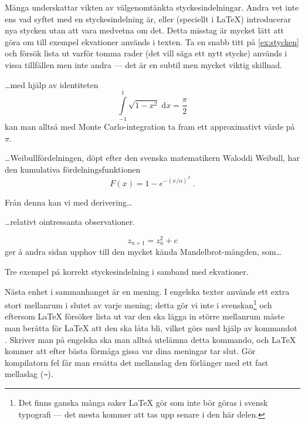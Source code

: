 \documentclass[lang=sv,ptsize=10pt,font=none,nomath,titles=bf,../../a4.tex]{subfiles}
\begin{document}
Många underskattar vikten av välgenomtänkta styckesindelningar. Andra vet
inte ens vad syftet med en styckesindelning är, eller (speciellt i 
\LaTeX{}) introducerar nya stycken utan att vara medvetna om det. Detta
misstag är mycket lätt att göra om till exempel ekvationer används i 
texten. Ta
en snabb titt på \cref{ex:stycken} och försök lista ut varför
tomma rader (det vill säga ett nytt stycke) används i vissa tillfällen 
men inte andra — det är en subtil men mycket viktig skillnad.

\begin{kod}[p]
	\begin{latexcode}
\ldots{}med hjälp av identiteten
\begin{equation}
\int\limits_{-1}^1\!\sqrt{1-x^2}\;\mathrm{d}x
= \frac{\pi}{2}
\end{equation}
kan man alltså med Monte Carlo-integration ta fram
ett approximativt värde på \(\pi\).

\ldots{}Weibullfördelningen, döpt efter den svenska
matematikern Waloddi Weibull, har den kumulativa
fördelningsfunktionen
\begin{equation}
F(x) = 1 - e^{-(x/\alpha)^\beta} \;.
\end{equation}

Från denna kan vi med derivering\ldots{}

\ldots{}relativt ointressanta observationer.

\begin{equation}
z_{n+1} = z_n^2 + c
\end{equation}
ger å andra sidan upphov till den mycket kända
Mandelbrot-mängden, som\ldots{}

	\end{latexcode}
	\caption{Tre exempel på korrekt styckesindelning i samband med
	ekvationer.}
	\label{ex:stycken}
\end{kod}

Nästa enhet i sammanhanget är en mening. I engelska texter används ett
extra stort mellanrum i slutet av varje mening; detta gör vi inte i
svenskan\footnote{Det finns ganska många saker \LaTeX{} gör som inte bör
göras i svensk typografi — det mesta kommer att tas upp senare i den här 
delen.} och eftersom \LaTeX{} försöker lista ut var den ska lägga in
större mellanrum måste man berätta för \LaTeX{} att den ska låta bli,
vilket görs
med hjälp av kommandot . Skriver man på engelska ska
man alltså utelämna detta kommando, och \LaTeX{} kommer att efter bästa
förmåga gissa var dina meningar tar slut. Gör kompilatorn fel får man 
ersätta det mellanslag den förlänger med ett fast mellaslag (\verb|~|).
\end{document}
